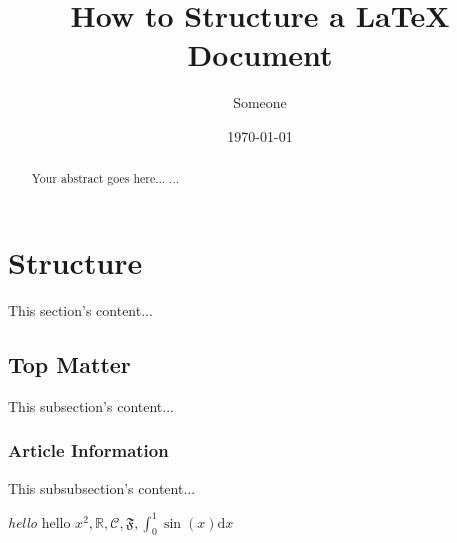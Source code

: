 \documentclass{article}
\begin{document}
\title{How to Structure a LaTeX Document}
\author{Someone}
\date{\today}
\maketitle

\begin{abstract}
Your abstract goes here...
...
\end{abstract}


\section{Structure}
This section's content...

\subsection{Top Matter}
This subsection's content...

\subsubsection{Article Information}
This subsubsection's content...

\emph{hello} hello $x^2, \mathbb R, \mathcal C, \mathfrak F, \int_0^1 \sin(x) \mathrm d x$
\end{document}
